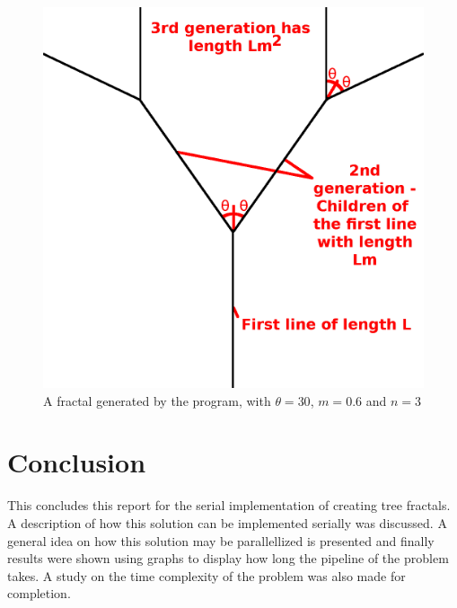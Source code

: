 \documentclass[11pt]{article}
\begin{document}
\begin{figure}
	\includegraphics[width=\linewidth]{Images/GeneralExplanation.png}
	\centering
	\caption{A fractal generated by the program, with $\theta=30$, $m=0.6$ and $n=3$}
	\label{general explanation}
\end{figure}





\section{Conclusion}
This concludes this report for the serial implementation of creating tree fractals. A description of how this solution can be implemented serially was discussed. A general idea on how this solution may be parallellized is presented and finally results were shown using graphs to display how long the pipeline of the problem takes. A study on the time complexity of the problem was also made for completion.




\pagebreak

%
\end{document}
